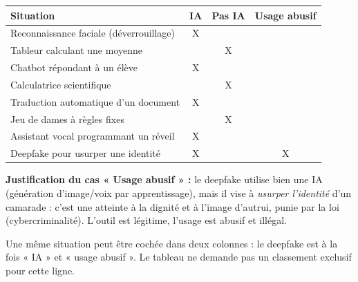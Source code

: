 \documentclass[11pt]{article}
\newcommand{\cle}[1]{{\popxbold\color{popdark}#1}}
\begin{document}
\begin{corrige}
\begin{center}
\begin{tabularx}{\linewidth}{|X|c|c|c|}
\hline
\rowcolor{popblueL}
\textbf{Situation} & \textbf{IA} & \textbf{Pas IA} & \textbf{Usage abusif} \\ \hline
Reconnaissance faciale (déverrouillage) & X & & \\ \hline
Tableur calculant une moyenne & & X & \\ \hline
Chatbot répondant à un élève & X & & \\ \hline
Calculatrice scientifique & & X & \\ \hline
Traduction automatique d'un document & X & & \\ \hline
Jeu de dames à règles fixes & & X & \\ \hline
Assistant vocal programmant un réveil & X & & \\ \hline
Deepfake pour usurper une identité & X & & X \\ \hline
\end{tabularx}
\end{center}

\textbf{Justification du cas « Usage abusif » :} le \cle{deepfake} utilise bien une IA (génération d'image/voix par apprentissage), mais il vise à \emph{usurper l'identité} d'un camarade : c'est une atteinte à la dignité et à l'image d'autrui, punie par la loi (cybercriminalité). L'outil est légitime, l'usage est abusif et illégal.
\end{corrige}

\begin{attention}
Une même situation peut être cochée dans deux colonnes : le deepfake est à la fois « IA » et « usage abusif ». Le tableau ne demande pas un classement exclusif pour cette ligne.
\end{attention}
\end{document}
